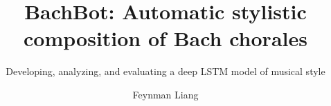\title{BachBot: Automatic stylistic composition of Bach chorales}

\subtitle{Developing, analyzing, and evaluating a deep LSTM model of musical style}

\author{Feynman Liang}










\renewcommand{\submissiontext}{M.Phil in Machine Learning, Speech, and Language Technology\newline\newline This dissertation is submitted for the degree of}




\newcommand{\wordcount}{11356}

\subject{Algorithmic Composition} 
